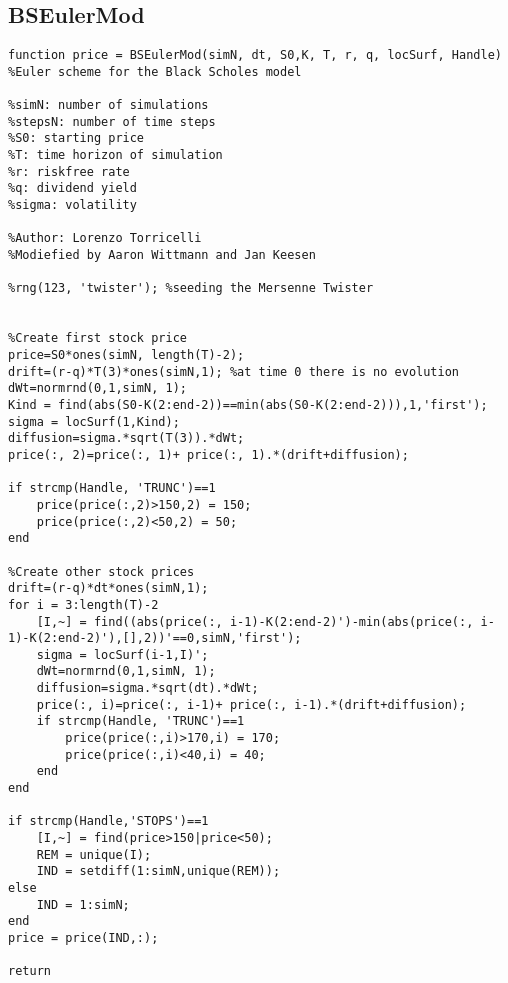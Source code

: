 \subsection*{BSEulerMod}
\begin{verbatim}
function price = BSEulerMod(simN, dt, S0,K, T, r, q, locSurf, Handle)
%Euler scheme for the Black Scholes model

%simN: number of simulations
%stepsN: number of time steps
%S0: starting price
%T: time horizon of simulation
%r: riskfree rate
%q: dividend yield
%sigma: volatility

%Author: Lorenzo Torricelli
%Modiefied by Aaron Wittmann and Jan Keesen

%rng(123, 'twister'); %seeding the Mersenne Twister


%Create first stock price
price=S0*ones(simN, length(T)-2);
drift=(r-q)*T(3)*ones(simN,1); %at time 0 there is no evolution
dWt=normrnd(0,1,simN, 1);
Kind = find(abs(S0-K(2:end-2))==min(abs(S0-K(2:end-2))),1,'first');
sigma = locSurf(1,Kind);
diffusion=sigma.*sqrt(T(3)).*dWt;
price(:, 2)=price(:, 1)+ price(:, 1).*(drift+diffusion);

if strcmp(Handle, 'TRUNC')==1
    price(price(:,2)>150,2) = 150;
    price(price(:,2)<50,2) = 50;
end

%Create other stock prices
drift=(r-q)*dt*ones(simN,1);
for i = 3:length(T)-2
    [I,~] = find((abs(price(:, i-1)-K(2:end-2)')-min(abs(price(:, i-1)-K(2:end-2)'),[],2))'==0,simN,'first');
    sigma = locSurf(i-1,I)';
    dWt=normrnd(0,1,simN, 1);
    diffusion=sigma.*sqrt(dt).*dWt;
    price(:, i)=price(:, i-1)+ price(:, i-1).*(drift+diffusion);
    if strcmp(Handle, 'TRUNC')==1
        price(price(:,i)>170,i) = 170;
        price(price(:,i)<40,i) = 40;
    end
end

if strcmp(Handle,'STOPS')==1
    [I,~] = find(price>150|price<50);
    REM = unique(I);
    IND = setdiff(1:simN,unique(REM));
else
    IND = 1:simN;
end
price = price(IND,:);

return
\end{verbatim}